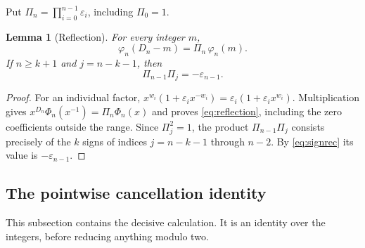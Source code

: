 \documentclass[11pt,letterpaper]{article}
\numberwithin{equation}{section}
\newtheorem{lemma}[theorem]{Lemma}
\theoremstyle{definition}
\theoremstyle{remark}
\newcommand{\eps}{\varepsilon}
\begin{document}
Put $\Pi_n=\prod_{i=0}^{n-1}\eps_i$, including $\Pi_0=1$.

\begin{lemma}[Reflection]
\label{lem:reflection}
For every integer $m$,
\begin{equation}
 \varphi_n(D_n-m)=\Pi_n\,\varphi_n(m).
 \label{eq:reflection}
\end{equation}
If $n\ge k+1$ and $j=n-k-1$, then
\begin{equation}
 \Pi_{n-1}\Pi_j=-\eps_{n-1}.
 \label{eq:Esign}
\end{equation}
\end{lemma}
\begin{proof}
For an individual factor,
$x^{w_i}(1+\eps_i x^{-w_i})=\eps_i(1+\eps_i x^{w_i})$.
Multiplication gives $x^{D_n}\Phi_n(x^{-1})=\Pi_n\Phi_n(x)$ and proves
\eqref{eq:reflection}, including the zero coefficients outside the range.
Since $\Pi_j^2=1$, the product $\Pi_{n-1}\Pi_j$ consists precisely of the
$k$ signs of indices $j=n-k-1$ through $n-2$. By \eqref{eq:signrec} its
value is $-\eps_{n-1}$.
\end{proof}

\subsection{The pointwise cancellation identity}
\label{sec:pointwise}

This subsection contains the decisive calculation. It is an identity over
the integers, before reducing anything modulo two.
\end{document}
